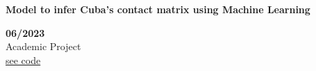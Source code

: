 \begin{minipage}{0.8\textwidth}
    \parbox{0.8\linewidth}{\textbf{Model to infer Cuba's contact matrix using Machine Learning}} \hfill \textbf{06/2023}\\
    Academic Project\\
    \href{https://github.com/geeksLabTech/epidemic-classification-ml-project}{see code}\\
    \end{minipage} \hfill {}\\\\